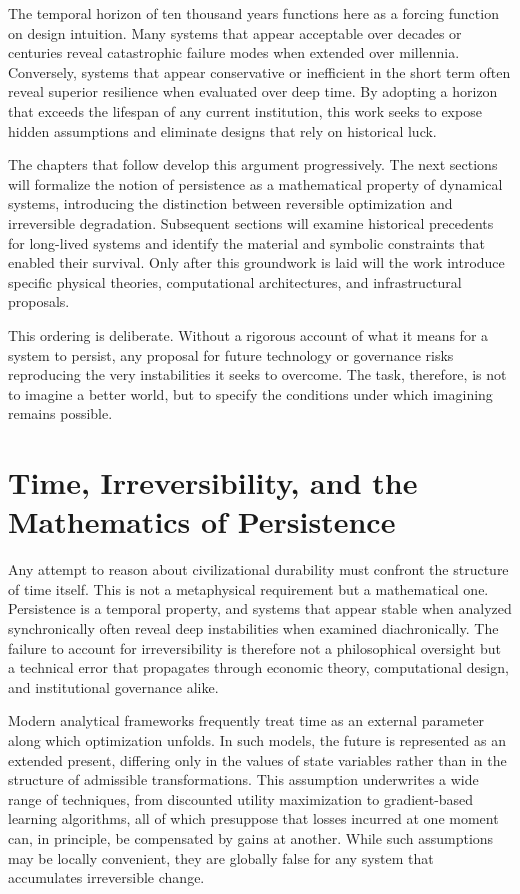 \documentclass[12pt,oneside]{book}
\begin{document}
The temporal horizon of ten thousand years functions here as a forcing function on design intuition. Many systems that appear acceptable over decades or centuries reveal catastrophic failure modes when extended over millennia. Conversely, systems that appear conservative or inefficient in the short term often reveal superior resilience when evaluated over deep time. By adopting a horizon that exceeds the lifespan of any current institution, this work seeks to expose hidden assumptions and eliminate designs that rely on historical luck.

The chapters that follow develop this argument progressively. The next sections will formalize the notion of persistence as a mathematical property of dynamical systems, introducing the distinction between reversible optimization and irreversible degradation. Subsequent sections will examine historical precedents for long-lived systems and identify the material and symbolic constraints that enabled their survival. Only after this groundwork is laid will the work introduce specific physical theories, computational architectures, and infrastructural proposals.

This ordering is deliberate. Without a rigorous account of what it means for a system to persist, any proposal for future technology or governance risks reproducing the very instabilities it seeks to overcome. The task, therefore, is not to imagine a better world, but to specify the conditions under which imagining remains possible.

\chapter{Time, Irreversibility, and the Mathematics of Persistence}

Any attempt to reason about civilizational durability must confront the structure of time itself. This is not a metaphysical requirement but a mathematical one. Persistence is a temporal property, and systems that appear stable when analyzed synchronically often reveal deep instabilities when examined diachronically. The failure to account for irreversibility is therefore not a philosophical oversight but a technical error that propagates through economic theory, computational design, and institutional governance alike.

Modern analytical frameworks frequently treat time as an external parameter along which optimization unfolds. In such models, the future is represented as an extended present, differing only in the values of state variables rather than in the structure of admissible transformations. This assumption underwrites a wide range of techniques, from discounted utility maximization to gradient-based learning algorithms, all of which presuppose that losses incurred at one moment can, in principle, be compensated by gains at another. While such assumptions may be locally convenient, they are globally false for any system that accumulates irreversible change.
\end{document}
